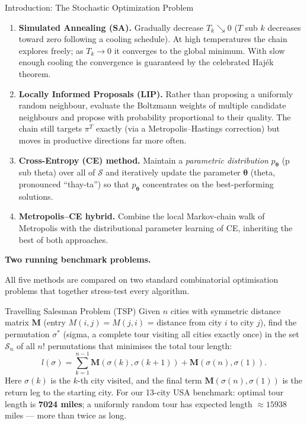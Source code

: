 \documentclass[aspectratio=169,10pt]{beamer}
\newcommand{\btheta}{\boldsymbol{\theta}}
\newcommand{\calS}{\mathcal{S}}
\begin{document}
\begin{frame}[allowframebreaks]{Introduction: The Stochastic Optimization Problem}
\begin{enumerate}
  \item \textbf{Simulated Annealing (SA).}  Gradually decrease
    $T_k \searrow 0$ ($T$ sub $k$ decreases toward zero following a cooling
    schedule).  At high temperatures the chain explores freely; as
    $T_k \to 0$ it converges to the global minimum.  With slow enough
    cooling the convergence is guaranteed by the celebrated Haj\'{e}k theorem.

  \item \textbf{Locally Informed Proposals (LIP).}  Rather than proposing a
    uniformly random neighbour, evaluate the Boltzmann weights of multiple
    candidate neighbours and propose with probability proportional to their
    quality.  The chain still targets $\pi^T$ exactly (via a
    Metropolis--Hastings correction) but moves in productive directions far
    more often.

  \item \textbf{Cross-Entropy (CE) method.}  Maintain a \emph{parametric
    distribution} $p_{\btheta}$ (p sub theta) over all of $\calS$ and
    iteratively update the parameter $\btheta$ (theta, pronounced ``thay-ta'')
    so that $p_{\btheta}$ concentrates on the best-performing solutions.

  \item \textbf{Metropolis--CE hybrid.}  Combine the local Markov-chain
    walk of Metropolis with the distributional parameter learning of CE,
    inheriting the best of both approaches.
\end{enumerate}

\framebreak

\textbf{Two running benchmark problems.}

All five methods are compared on two standard combinatorial optimisation
problems that together stress-test every algorithm.

\begin{block}{Travelling Salesman Problem (TSP)}
  Given $n$ cities with symmetric distance matrix $\mathbf{M}$ (entry
  $M(i,j) = M(j,i)$ = distance from city $i$ to city $j$), find the
  permutation $\sigma^*$ (sigma, a complete tour visiting all cities exactly
  once) in the set $\mathcal{S}_n$ of all $n!$ permutations that minimises
  the total tour length:
  \[
    l(\sigma) = \sum_{k=1}^{n-1}\mathbf{M}(\sigma(k),\sigma(k+1))
      + \mathbf{M}(\sigma(n),\sigma(1)).
  \]
  Here $\sigma(k)$ is the $k$-th city visited, and the final term
  $\mathbf{M}(\sigma(n),\sigma(1))$ is the return leg to the starting city.
  For our 13-city USA benchmark: optimal tour length is \textbf{7024 miles};
  a uniformly random tour has expected length $\approx 15938$ miles --- more
  than twice as long.
\end{block}


\end{frame}
\end{document}
